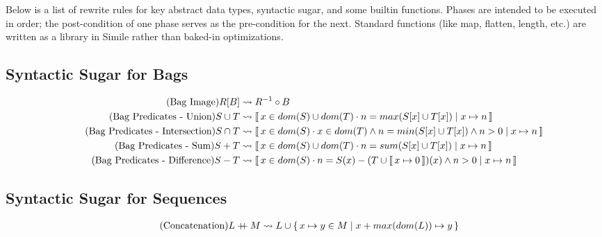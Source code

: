 
Below is a list of rewrite rules for key abstract data types, syntactic sugar, and some builtin functions. Phases are intended to be executed in order; the post-condition of one phase serves as the pre-condition for the next. Standard functions (like map, flatten, length, etc.) are written as a library in Simile rather than baked-in optimizations.


\subsection{Syntactic Sugar for Bags}
\begin{align}
  \tag{Bag Image}
  R[B]
  &\leadsto
  R^{-1} \circ B
  \\
  \tag{Bag Predicates - Union}
  S \cup T &\leadsto \Bag{x \in dom(S) \cup dom(T)}{n = max(S[x] \cup T[x])}{x \mapsto n}
  \\
  \tag{Bag Predicates - Intersection}
  S \cap T &\leadsto \Bag{x \in dom(S)}{x \in dom(T) \land n = min(S[x] \cup T[x]) \land n > 0}{x \mapsto n}
  \\
  \tag{Bag Predicates - Sum}
  S + T &\leadsto \Bag{x \in dom(S) \cup dom(T)}{n = sum(S[x] \cup T[x])}{x \mapsto n}
  \\
  \tag{Bag Predicates - Difference}
  S - T &\leadsto \Bag{x \in dom(S)}{n = S(x) - (T \cup \Bag{x \mapsto 0})(x) \land n > 0}{x \mapsto n}
\end{align}

\subsection{Syntactic Sugar for Sequences}
\begin{align}
    \tag{Concatenation}
    L \concat M
    &\leadsto
    L \cup \Set{x \mapsto y \in M }{x + max(dom(L)) \mapsto y}
\end{align}

